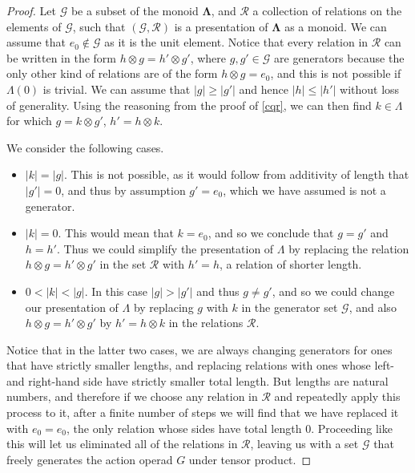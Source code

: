 \documentclass{amsbook} %
\newcommand{\ML}{\mathbf{\Lambda}}
\numberwithin{section}{chapter}
\begin{document}
\begin{proof}
Let $\mathcal{G}$ be a subset of the monoid $\ML$, and $\mathcal{R}$ a collection of relations on the elements of $\mathcal{G}$, such that $(\mathcal{G},\mathcal{R})$ is a presentation of $\ML$ as a monoid. We can assume that $e_0 \notin \mathcal{G}$ as it is the unit element. Notice that every relation in $\mathcal{R}$ can be written in the form $h \otimes g = h' \otimes g'$, where $g,g' \in \mathcal{G}$ are generators because the only other kind of relations are of the form $h \otimes g = e_0$, and  this is not possible if $\Lambda(0)$ is trivial. We can assume that  $|g| \ge |g'|$ and hence $|h| \le |h'|$ without loss of generality. Using the reasoning from the proof of \cref{cqr}, we can then find $k \in \Lambda$ for which $g = k \otimes g'$, $h' = h \otimes k$. 
%

We consider the following cases.
\begin{itemize}
\item $|k| = |g|$. This is not possible, as it would follow from additivity of length that $|g'|=0$, and thus by assumption $g' = e_0$, which we have assumed is not a generator.
\item $|k|=0$. This would mean that $k=e_0$, and so we conclude that $g=g'$ and $h = h'$. Thus we could simplify the presentation of $\Lambda$ by replacing the relation $h \otimes g = h' \otimes g'$ in the set $\mathcal{R}$ with $h' = h$, a relation of shorter length.
\item $0 < |k| < |g|$. In this case $|g| > |g'|$ and thus $g \neq g'$, and so we could change our presentation of $\Lambda$ by replacing $g$ with $k$ in the generator set $\mathcal{G}$, and also $h \otimes g = h' \otimes g'$ by $h' = h \otimes k$ in the relations $\mathcal{R}$.
\end{itemize}
Notice that in the latter two cases, we are always changing generators for ones that have strictly smaller lengths, and replacing relations with ones whose left- and right-hand side have strictly smaller total length. But lengths are natural numbers, and therefore if we choose any relation in $\mathcal{R}$ and repeatedly apply this process to it, after a finite number of steps we will find that we have replaced it with $e_0 = e_0$, the only relation whose sides have total length $0$. Proceeding like this will let us eliminated all of the relations in $\mathcal{R}$, leaving us with a set $\mathcal{G}$ that freely generates the action operad $G$ under tensor product.
\end{proof} 
\end{document}
